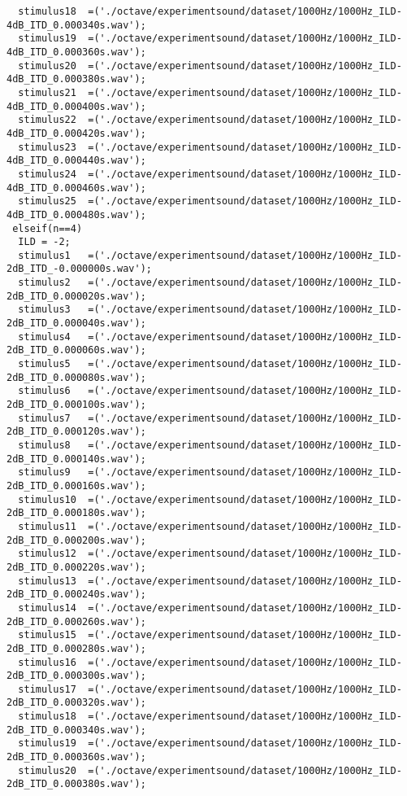 {\begin{verbatim}
  stimulus18  =('./octave/experimentsound/dataset/1000Hz/1000Hz_ILD-4dB_ITD_0.000340s.wav');
  stimulus19  =('./octave/experimentsound/dataset/1000Hz/1000Hz_ILD-4dB_ITD_0.000360s.wav');
  stimulus20  =('./octave/experimentsound/dataset/1000Hz/1000Hz_ILD-4dB_ITD_0.000380s.wav');
  stimulus21  =('./octave/experimentsound/dataset/1000Hz/1000Hz_ILD-4dB_ITD_0.000400s.wav');
  stimulus22  =('./octave/experimentsound/dataset/1000Hz/1000Hz_ILD-4dB_ITD_0.000420s.wav');
  stimulus23  =('./octave/experimentsound/dataset/1000Hz/1000Hz_ILD-4dB_ITD_0.000440s.wav');
  stimulus24  =('./octave/experimentsound/dataset/1000Hz/1000Hz_ILD-4dB_ITD_0.000460s.wav');
  stimulus25  =('./octave/experimentsound/dataset/1000Hz/1000Hz_ILD-4dB_ITD_0.000480s.wav');
 elseif(n==4)
  ILD = -2;
  stimulus1   =('./octave/experimentsound/dataset/1000Hz/1000Hz_ILD-2dB_ITD_-0.000000s.wav');
  stimulus2   =('./octave/experimentsound/dataset/1000Hz/1000Hz_ILD-2dB_ITD_0.000020s.wav');
  stimulus3   =('./octave/experimentsound/dataset/1000Hz/1000Hz_ILD-2dB_ITD_0.000040s.wav');
  stimulus4   =('./octave/experimentsound/dataset/1000Hz/1000Hz_ILD-2dB_ITD_0.000060s.wav');
  stimulus5   =('./octave/experimentsound/dataset/1000Hz/1000Hz_ILD-2dB_ITD_0.000080s.wav');
  stimulus6   =('./octave/experimentsound/dataset/1000Hz/1000Hz_ILD-2dB_ITD_0.000100s.wav');
  stimulus7   =('./octave/experimentsound/dataset/1000Hz/1000Hz_ILD-2dB_ITD_0.000120s.wav');
  stimulus8   =('./octave/experimentsound/dataset/1000Hz/1000Hz_ILD-2dB_ITD_0.000140s.wav');
  stimulus9   =('./octave/experimentsound/dataset/1000Hz/1000Hz_ILD-2dB_ITD_0.000160s.wav');
  stimulus10  =('./octave/experimentsound/dataset/1000Hz/1000Hz_ILD-2dB_ITD_0.000180s.wav');
  stimulus11  =('./octave/experimentsound/dataset/1000Hz/1000Hz_ILD-2dB_ITD_0.000200s.wav');
  stimulus12  =('./octave/experimentsound/dataset/1000Hz/1000Hz_ILD-2dB_ITD_0.000220s.wav');
  stimulus13  =('./octave/experimentsound/dataset/1000Hz/1000Hz_ILD-2dB_ITD_0.000240s.wav');
  stimulus14  =('./octave/experimentsound/dataset/1000Hz/1000Hz_ILD-2dB_ITD_0.000260s.wav');
  stimulus15  =('./octave/experimentsound/dataset/1000Hz/1000Hz_ILD-2dB_ITD_0.000280s.wav');
  stimulus16  =('./octave/experimentsound/dataset/1000Hz/1000Hz_ILD-2dB_ITD_0.000300s.wav');
  stimulus17  =('./octave/experimentsound/dataset/1000Hz/1000Hz_ILD-2dB_ITD_0.000320s.wav');
  stimulus18  =('./octave/experimentsound/dataset/1000Hz/1000Hz_ILD-2dB_ITD_0.000340s.wav');
  stimulus19  =('./octave/experimentsound/dataset/1000Hz/1000Hz_ILD-2dB_ITD_0.000360s.wav');
  stimulus20  =('./octave/experimentsound/dataset/1000Hz/1000Hz_ILD-2dB_ITD_0.000380s.wav');

\end{verbatim}}

